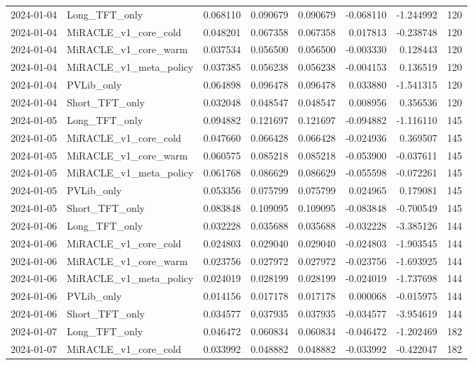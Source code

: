 \begin{tabular}{llrrrrrr}
2024-01-04 & Long_TFT_only & 0.068110 & 0.090679 & 0.090679 & -0.068110 & -1.244992 & 120 \\
2024-01-04 & MiRACLE_v1_core_cold & 0.048201 & 0.067358 & 0.067358 & 0.017813 & -0.238748 & 120 \\
2024-01-04 & MiRACLE_v1_core_warm & 0.037534 & 0.056500 & 0.056500 & -0.003330 & 0.128443 & 120 \\
2024-01-04 & MiRACLE_v1_meta_policy & 0.037385 & 0.056238 & 0.056238 & -0.004153 & 0.136519 & 120 \\
2024-01-04 & PVLib_only & 0.064898 & 0.096478 & 0.096478 & 0.033880 & -1.541315 & 120 \\
2024-01-04 & Short_TFT_only & 0.032048 & 0.048547 & 0.048547 & 0.008956 & 0.356536 & 120 \\
2024-01-05 & Long_TFT_only & 0.094882 & 0.121697 & 0.121697 & -0.094882 & -1.116110 & 145 \\
2024-01-05 & MiRACLE_v1_core_cold & 0.047660 & 0.066428 & 0.066428 & -0.024936 & 0.369507 & 145 \\
2024-01-05 & MiRACLE_v1_core_warm & 0.060575 & 0.085218 & 0.085218 & -0.053900 & -0.037611 & 145 \\
2024-01-05 & MiRACLE_v1_meta_policy & 0.061768 & 0.086629 & 0.086629 & -0.055598 & -0.072261 & 145 \\
2024-01-05 & PVLib_only & 0.053356 & 0.075799 & 0.075799 & 0.024965 & 0.179081 & 145 \\
2024-01-05 & Short_TFT_only & 0.083848 & 0.109095 & 0.109095 & -0.083848 & -0.700549 & 145 \\
2024-01-06 & Long_TFT_only & 0.032228 & 0.035688 & 0.035688 & -0.032228 & -3.385126 & 144 \\
2024-01-06 & MiRACLE_v1_core_cold & 0.024803 & 0.029040 & 0.029040 & -0.024803 & -1.903545 & 144 \\
2024-01-06 & MiRACLE_v1_core_warm & 0.023756 & 0.027972 & 0.027972 & -0.023756 & -1.693925 & 144 \\
2024-01-06 & MiRACLE_v1_meta_policy & 0.024019 & 0.028199 & 0.028199 & -0.024019 & -1.737698 & 144 \\
2024-01-06 & PVLib_only & 0.014156 & 0.017178 & 0.017178 & 0.000068 & -0.015975 & 144 \\
2024-01-06 & Short_TFT_only & 0.034577 & 0.037935 & 0.037935 & -0.034577 & -3.954619 & 144 \\
2024-01-07 & Long_TFT_only & 0.046472 & 0.060834 & 0.060834 & -0.046472 & -1.202469 & 182 \\
2024-01-07 & MiRACLE_v1_core_cold & 0.033992 & 0.048882 & 0.048882 & -0.033992 & -0.422047 & 182 \\

\end{tabular}
